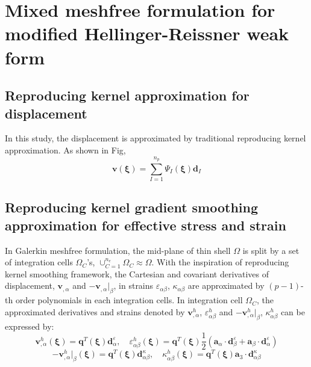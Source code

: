 \section{Mixed meshfree formulation for modified Hellinger-Reissner weak form}
\subsection{Reproducing kernel approximation for displacement}
In this study, the displacement is approximated by traditional reproducing kernel approximation. As shown in Fig, 
\begin{equation}\label{approxv}
\boldsymbol v(\boldsymbol \xi) = \sum_{I=1}^{n_p} \Psi_I(\boldsymbol \xi) \boldsymbol d_I
\end{equation}

\subsection{Reproducing kernel gradient smoothing approximation for effective stress and strain}
In Galerkin meshfree formulation, the mid-plane of thin shell $\Omega$ is split by a set of integration cells $\Omega_C$'s, $\cup_{C=1}^{n_e}\Omega_C\approx \Omega$. With the inspiration of reproducing kernel smoothing framework, the Cartesian and covariant derivatives of displacement, $\boldsymbol v_{,\alpha}$ and $-\boldsymbol v_{,\alpha}\vert_\beta$, in strains $\varepsilon_{\alpha\beta}$, $\kappa_{\alpha\beta}$ are approximated by $(p-1)$-th order polynomials in each integration cells. In integration cell $\Omega_C$, the approximated derivatives and strains denoted by $\boldsymbol v^h_{,\alpha}$, $\varepsilon^h_{\alpha\beta}$ and $-\boldsymbol v^h_{,\alpha}\vert_\beta$, $\kappa^h_{\alpha\beta}$ can be expressed by:
\begin{equation}\label{approxsn1}
    \boldsymbol v^h_{,\alpha}(\boldsymbol \xi) = \boldsymbol q^T(\boldsymbol \xi) \boldsymbol d_{\alpha}^\varepsilon, \quad
    \varepsilon^h_{\alpha\beta}(\boldsymbol \xi) = \boldsymbol q^T(\boldsymbol \xi) \frac{1}{2}(\boldsymbol a_\alpha \cdot \boldsymbol d_{\beta}^\varepsilon + \boldsymbol a_\beta \cdot \boldsymbol d_{\alpha}^\varepsilon)
\end{equation}
\begin{equation}\label{approxsn2}
    -\boldsymbol v^h_{,\alpha}\vert_\beta(\boldsymbol \xi) = \boldsymbol q^T(\boldsymbol \xi) \boldsymbol d_{\alpha\beta}^\kappa , \quad
    \kappa^h_{\alpha\beta}(\boldsymbol \xi) = \boldsymbol q^T(\boldsymbol \xi) \boldsymbol a_3 \cdot \boldsymbol d_{\alpha\beta}^\kappa
\end{equation}

